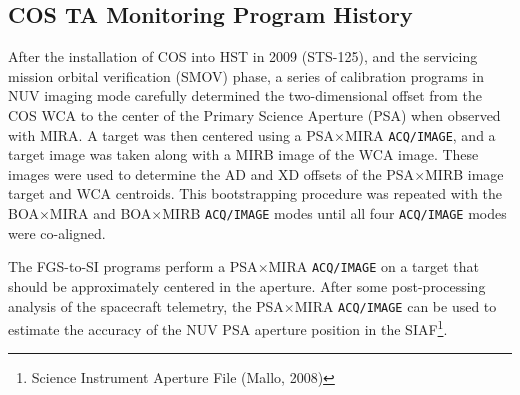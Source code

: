 \subsection{COS TA Monitoring Program History}\label{subsec:History}
After the installation of COS into HST in 2009 (STS-125), and the servicing mission orbital verification (SMOV) phase,
a series of calibration programs in NUV imaging mode carefully determined the two-dimensional offset from the COS WCA to the center of the Primary Science Aperture (PSA) when observed with MIRA.
A target was then centered using a PSA$\times$MIRA \texttt{ACQ/IMAGE}, and a target image was taken along with a MIRB image
of the WCA image. These images were used to determine the AD and XD offsets of the PSA$\times$MIRB image target and WCA centroids.
This bootstrapping procedure was repeated with the BOA$\times$MIRA and BOA$\times$MIRB \texttt{ACQ/IMAGE} modes until all four \texttt{ACQ/IMAGE} modes were co-aligned.

The FGS-to-SI programs perform a PSA$\times$MIRA \texttt{ACQ/IMAGE} on a target that should be approximately centered in the aperture.
After some post-processing analysis of the spacecraft telemetry, the PSA$\times$MIRA \texttt{ACQ/IMAGE} can be used to estimate the accuracy of the NUV PSA aperture position in the SIAF\footnote{Science Instrument Aperture File (Mallo, 2008)}.


